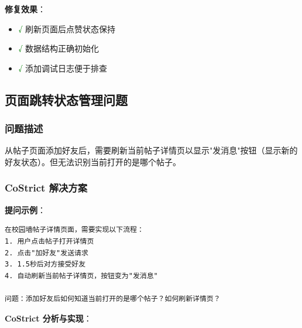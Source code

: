 ﻿\documentclass[12pt,a4paper]{article}
\begin{document}
\textbf{修复效果}：
\begin{itemize}
    \item \textcolor{green}{√} 刷新页面后点赞状态保持
    \item \textcolor{green}{√} 数据结构正确初始化
    \item \textcolor{green}{√} 添加调试日志便于排查
\end{itemize}

\subsection{页面跳转状态管理问题}

\subsubsection{问题描述}

从帖子页面添加好友后，需要刷新当前帖子详情页以显示"发消息"按钮（显示新的好友状态）。但无法识别当前打开的是哪个帖子。

\subsubsection{CoStrict 解决方案}

\textbf{提问示例}：
\begin{verbatim}
在校园墙帖子详情页面，需要实现以下流程：
1. 用户点击帖子打开详情页
2. 点击"加好友"发送请求
3. 1.5秒后对方接受好友
4. 自动刷新当前帖子详情页，按钮变为"发消息"

问题：添加好友后如何知道当前打开的是哪个帖子？如何刷新详情页？
\end{verbatim}

\textbf{CoStrict 分析与实现}：
\end{document}
